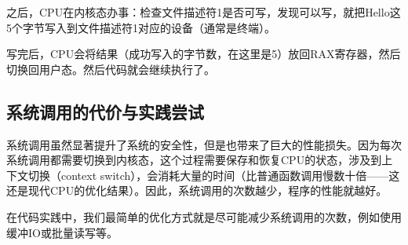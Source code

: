 \documentclass[../main.tex]{subfiles}
\begin{document}
之后，CPU在内核态办事：检查文件描述符1是否可写，发现可以写，就把Hello这5个字节写入到文件描述符1对应的设备（通常是终端）。

写完后，CPU会将结果（成功写入的字节数，在这里是5）放回RAX寄存器，然后切换回用户态。然后代码就会继续执行了。

\subsection{系统调用的代价与实践尝试}

系统调用虽然显著提升了系统的安全性，但是也带来了巨大的性能损失。因为每次系统调用都需要切换到内核态，这个过程需要保存和恢复CPU的状态，涉及到上下文切换（context switch），会消耗大量的时间（比普通函数调用慢数十倍——这还是现代CPU的优化结果）。因此，系统调用的次数越少，程序的性能就越好。

在代码实践中，我们最简单的优化方式就是尽可能减少系统调用的次数，例如使用缓冲IO或批量读写等。
\end{document}
